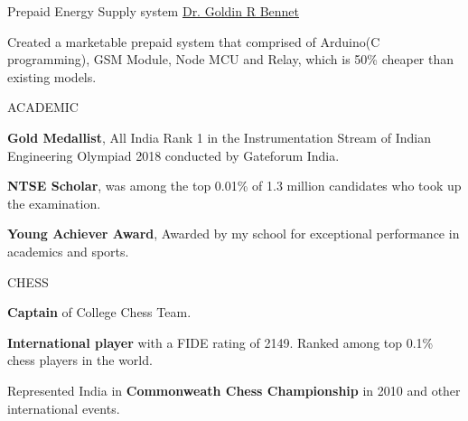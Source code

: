 \documentclass[10pt]{article}
\begin{document}
\headedsectiontwo
{Prepaid Energy Supply system}{}
{\href{https://www.nitt.edu/home/academics/departments/ice/faculty/bennet/}{Dr. Goldin R Bennet}}
{\vspace{-2.4ex}
    \begin{circlist}
        \item Created a marketable prepaid system that comprised of Arduino(C programming), GSM Module, Node MCU and Relay, which is 50\% cheaper than existing models.
    \end{circlist}
}



\spacedhrule{0.8ex}{0.0ex}

\headedsectionthree
{ACADEMIC} {{}{}{}{}}
{}
{\vspace{-4.5ex}
    \begin{circlist}
        \item \textbf{Gold Medallist}, All India Rank 1 in the Instrumentation Stream of Indian Engineering Olympiad 2018 conducted by Gateforum India.
        \item \textbf{NTSE Scholar}, was among the top 0.01\% of 1.3 million candidates who took up the examination.
        \item \textbf{Young Achiever Award}, Awarded by my school for exceptional performance in academics and sports.
    \end{circlist}
}

\headedsectionthree
{CHESS} {{}{}{}}
{}
{\vspace{-4.5ex}
    \begin{circlist}
	    \item \textbf{Captain} of College Chess Team.
	    \item \textbf{International player} with a FIDE rating of 2149. Ranked among top 0.1\% chess players in the world.
	    \item  Represented India in \textbf{Commonweath Chess Championship} in 2010 and other international events.
    \end{circlist}
}
\end{document}
